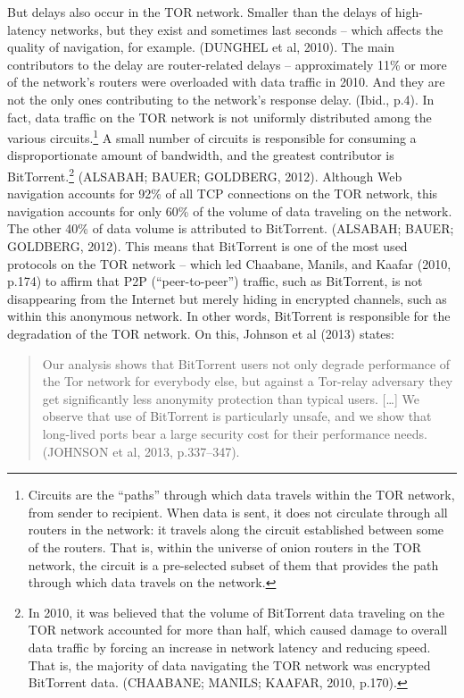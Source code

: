 But delays also occur in the TOR network. Smaller than the delays of high-latency networks, but they exist and sometimes last seconds -- which affects the quality of navigation, for example. (DUNGHEL et al, 2010). The main contributors to the delay are router-related delays -- approximately 11\% or more of the network's routers were overloaded with data traffic in 2010. And they are not the only ones contributing to the network's response delay. (Ibid., p.4). In fact, data traffic on the TOR network is not uniformly distributed among the various circuits.\footnote{Circuits are the ``paths'' through which data travels within the TOR network, from sender to recipient. When data is sent, it does not circulate through all routers in the network: it travels along the circuit established between some of the routers. That is, within the universe of onion routers in the TOR network, the circuit is a pre-selected subset of them that provides the path through which data travels on the network.} A small number of circuits is responsible for consuming a disproportionate amount of bandwidth, and the greatest contributor is BitTorrent.\footnote{In 2010, it was believed that the volume of BitTorrent data traveling on the TOR network accounted for more than half, which caused damage to overall data traffic by forcing an increase in network latency and reducing speed. That is, the majority of data navigating the TOR network was encrypted BitTorrent data. (CHAABANE; MANILS; KAAFAR, 2010, p.170).} (ALSABAH; BAUER; GOLDBERG, 2012). Although Web navigation accounts for 92\% of all TCP connections on the TOR network, this navigation accounts for only 60\% of the volume of data traveling on the network. The other 40\% of data volume is attributed to BitTorrent. (ALSABAH; BAUER; GOLDBERG, 2012). This means that BitTorrent is one of the most used protocols on the TOR network -- which led Chaabane, Manils, and Kaafar (2010, p.174) to affirm that P2P (``peer-to-peer'') traffic, such as BitTorrent, is not disappearing from the Internet but merely hiding in encrypted channels, such as within this anonymous network. In other words, BitTorrent is responsible for the degradation of the TOR network. On this, Johnson et al (2013) states:

\begin{quote}
Our analysis shows that BitTorrent users not only degrade performance of the Tor network for everybody else, but against a Tor-relay adversary they get significantly less anonymity protection than typical users. {[}\ldots{]} We observe that use of BitTorrent is particularly unsafe, and we show that long-lived ports bear a large security cost for their performance needs. (JOHNSON et al, 2013, p.337--347).
\end{quote}

